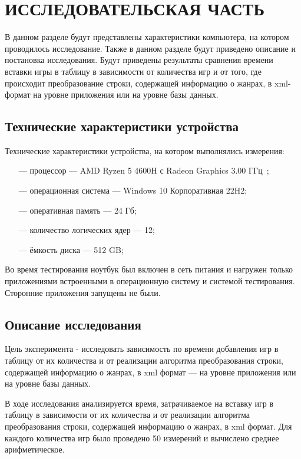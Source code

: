 \chapter{ИССЛЕДОВАТЕЛЬСКАЯ ЧАСТЬ}

В данном разделе будут представлены характеристики компьютера, на котором проводилось исследование. Также в данном разделе будут приведено описание и постановка исследования. Будут приведены результаты сравнения времени вставки игры в таблицу в зависимости от количества игр и от того, где происходит преобразование строки, содержащей информацию о жанрах, в xml-формат на уровне приложения или на уровне базы данных.

\section{Технические характеристики устройства}

Технические характеристики устройства, на котором выполнялись измерения:

\begin{itemize}
	\item[---] процессор --- AMD Ryzen 5 4600H с Radeon Graphics 3.00 ГГц~\cite{proc};
	\item[---] операционная система --- Windows 10 Корпоративная 22H2;
	\item[---] оперативная память --- 24 Гб;
	\item[---] количество логических ядер --- 12;
	\item[---] ёмкость диска --- 512 GB;
\end{itemize}

Во время тестирования ноутбук был включен в сеть питания и нагружен только приложениями встроенными в операционную систему и системой тестирования. Сторонние приложения запущены не были.

\section{Описание исследования}

Цель эксперимента - исследовать зависимость по времени добавления игр в таблицу от их количества и от реализации алгоритма преобразования строки, содержащей информацию о жанрах, в xml формат --- на уровне приложения или на уровне базы данных. 

В ходе исследования анализируется время, затрачиваемое на вставку игр в таблицу в зависимости от их количества и от реализации алгоритма преобразования строки, содержащей информацию о жанрах, в xml формат. Для каждого количества игр было проведено 50 измерений и вычислено среднее арифметическое.


